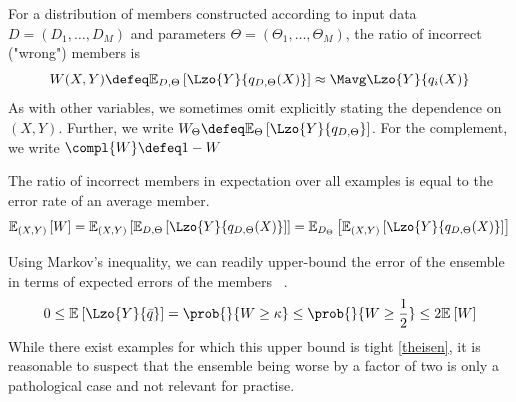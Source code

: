\documentclass[../main.tex]{subfiles}
\begin{document}
\begin{definition}
For a distribution of members constructed according to input data $D = (D_{1}, \dots, D_{M})$ and parameters $\Theta = (\Theta_{1}, \dots, \Theta_{M})$, the ratio of incorrect ("wrong") members is
$$
W(X,Y) \defeq \mathbb{E}_{D, \Theta}\left[ \Lzo{Y}{q_{D, \Theta}(X)} \right] \approx \Mavg \Lzo{Y}{q_{i}(X)}
$$
As with other variables, we sometimes omit explicitly stating the dependence on $(X,Y)$. Further, we write $W_{\Theta} \defeq \mathbb{E}_{\Theta}\left[ \Lzo{Y}{q_{D, \Theta}} \right]$. For the complement, we write $\compl{W} \defeq 1 - W$
\end{definition}

The ratio of incorrect members in expectation over all examples is equal to the error rate of an average member.
\begin{align} 
\label{eq:exp-error-exp-ratio-wrong} 
\mathbb{E}_{(X,Y) }\left[ W  \right]  = \mathbb{E}_{(X,Y) }\left[ \mathbb{E}_{D,\Theta}\left[ \Lzo{Y}{q_{D,\Theta}(X)} \right]  \right]  = \mathbb{E}_{D_{\Theta}}\left[ \mathbb{E}_{(X,Y) }\left[ \Lzo{Y}{q_{D,\Theta}(X)} \right]  \right] 
\end{align}


Using Markov's inequality, we can readily upper-bound the error of the ensemble in terms of expected errors of the members~\cite{theisen}
.
$$
0 \leq \mathbb{E}_{}\left[ \Lzo{Y}{\bar{q}} \right] = \prob{}{W \geq \kappa} \leq \prob{}{W \geq \frac{1}{2}} \leq 2 \mathbb{E}_{}\left[ W \right] 
$$
While there exist examples for which this upper bound is tight \ref{theisen}, it is reasonable to suspect that the ensemble being worse by a factor of two is only a pathological case and not relevant for practise.

\end{document}
